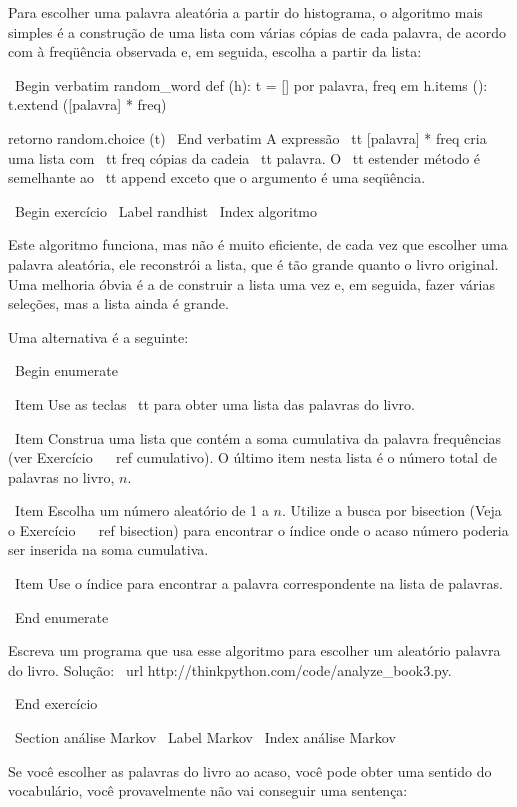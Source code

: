 \documentclass[10pt]{book}
\begin{document}
\begin {itemize}
{{{{{{{{{Para escolher uma palavra aleatória a partir do histograma, o algoritmo mais simples
é a construção de uma lista com várias cópias de cada palavra, de acordo com
à freqüência observada e, em seguida, escolha a partir da lista:

\ Begin {verbatim}
random_word def (h):
    t = []
    por palavra, freq em h.items ():
        t.extend ([palavra] * freq)

    retorno random.choice (t)
\ End {verbatim}
%
A expressão {\ tt [palavra] * freq} cria uma lista com {\ tt freq}
cópias da cadeia {\ tt palavra}. O {\ tt estender}
método é semelhante ao {\ tt append} exceto que o argumento é
uma seqüência.

\ Begin {} exercício
\ Label {} randhist
\ Index {algoritmo}

Este algoritmo funciona, mas não é muito eficiente, de cada vez que
escolher uma palavra aleatória, ele reconstrói a lista, que é tão grande quanto
o livro original. Uma melhoria óbvia é a de construir a lista
uma vez e, em seguida, fazer várias seleções, mas a lista ainda é grande.

Uma alternativa é a seguinte:

\ Begin {enumerate}

\ Item Use as teclas {\ tt} para obter uma lista das palavras do livro.

\ Item Construa uma lista que contém a soma cumulativa da palavra
  frequências (ver Exercício ~ \ ref {cumulativo}). O último item
  nesta lista é o número total de palavras no livro, $ n $.
  
\ Item Escolha um número aleatório de 1 a $ n $. Utilize a busca por bisection
  (Veja o Exercício ~ \ ref {} bisection) para encontrar o índice onde o acaso
  número poderia ser inserida na soma cumulativa.

\ Item Use o índice para encontrar a palavra correspondente na lista de palavras.

\ End {enumerate}

Escreva um programa que usa esse algoritmo para escolher um aleatório
palavra do livro. Solução: \ url {http://thinkpython.com/code/analyze_book3.py}.

\ End {} exercício



\ Section {} análise Markov
\ Label {} Markov
\ Index {análise Markov}

Se você escolher as palavras do livro ao acaso, você pode obter uma
sentido do vocabulário, você provavelmente não vai conseguir uma sentença:

}}}}}}}}}
\end{itemize}
\end{document}
